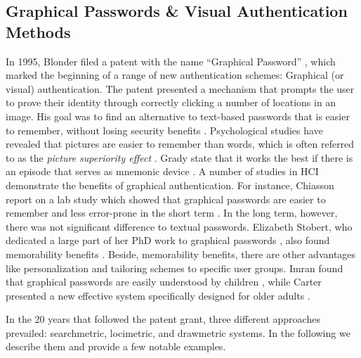 	\subsection{Graphical Passwords \& Visual Authentication Methods}\label{sec:rw:graphical_pws}
	In 1995, Blonder filed a patent with the name ``Graphical Password'' \cite{Blonder1996PatentGraphicalPW}, which marked the beginning of a range of new authentication schemes: Graphical (or visual) authentication. The patent presented a mechanism that prompts the user to prove their identity through correctly clicking a number of locations in an image. His goal was to find an alternative to text-based passwords that is easier to remember, without losing security benefits \cite{Biddle2009GraphicalFirstTwelveYears, Renaud2009VisualSnakeOil}. Psychological studies have revealed that pictures are easier to remember than words, which is often referred to as the \textit{picture superiority effect} \cite{Paivio1968PicturesEasierThanWords}. Grady \etal state that it works the best if there is an episode that serves as mnemonic device \cite{Grady1998NeuralCorrelates}. A number of studies in HCI demonstrate the benefits of graphical authentication. For instance, Chiasson \etal report on a lab study which showed that graphical passwords are easier to remember and less error-prone in the short term \cite{Chiasson2009InterferencesGraphical}. In the long term, however, there was not significant difference to textual passwords. Elizabeth Stobert, who dedicated a large part of her PhD work to graphical passwords \cite{Stobert2015Dissertation}, also found memorability benefits \cite{Stobert2013GraphicalPasswords}. Beside, memorability benefits, there are other advantages like personalization and tailoring schemes to specific user groups. Imran found that graphical passwords are easily understood by children \cite{Imran2015PWsAdultsChildren}, while Carter presented a new effective system specifically designed for older adults \cite{Carter2015GraphicalPasswordsOlderUsers}. 
	
	In the 20 years that followed the patent grant, three different approaches prevailed: searchmetric, locimetric, and drawmetric systems. In the following we describe them and provide a few notable examples. 
		
